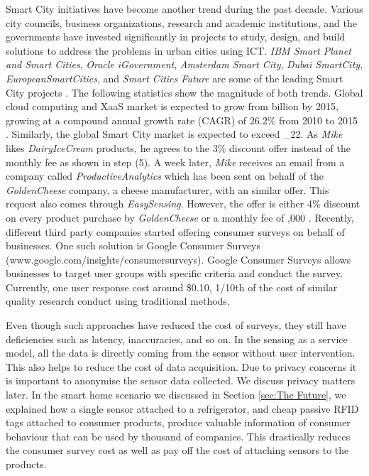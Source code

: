 \documentclass[times]{ettauth}
\begin{document}
Smart City initiatives have become another trend during the past decade. Various city councils, business organizations, research and academic institutions, and the governments have invested significantly in projects to study, design, and build solutions to address the problems in urban cities using ICT. \textit{IBM Smart Planet and Smart Cities}, \textit{Oracle iGovernment},\textit{ Amsterdam Smart City}, \textit{Dubai SmartCity}, \textit{EuropeanSmartCities}, and\textit{ Smart Cities Future} are some of the leading Smart City projects \cite{P537, P536}. The following statistics show the magnitude of both trends. Global cloud computing and XaaS market is expected to grow from  billion by 2015, growing at a compound annual growth rate (CAGR) of 26.2\% from 2010 to 2015 \cite{P539}. Similarly, the global Smart City market is expected to exceed \_{2}2. As \textit{Mike} likes \textit{DairyIceCream} products, he agrees to the 3\% discount offer instead of the monthly fee as shown in  step (5). A week later, \textit{Mike} receives an email from a company called \textit{ProductiveAnalytics} which has been sent on behalf of the \textit{GoldenCheese} company, a cheese manufacturer, with an similar offer. This request  also comes through \textit{EasySensing}. However, the offer is either 4\% discount on every product purchase by \textit{GoldenCheese} or a monthly fee of \8,000 \cite{P632}. Recently, different third party companies started offering consumer surveys on behalf of businesses. One such solution is Google Consumer Surveys (www.google.com/insights/consumersurveys). Google Consumer Surveys allows businesses to target user groups with specific criteria and conduct the survey. Currently, one user response cost around \$0.10, 1/10th of the cost of similar quality research conduct using traditional methods. 

Even though such approaches have reduced the cost of surveys, they still have deficiencies such as latency, inaccuracies, and so on. In the sensing as a service model, all the data is directly coming from the sensor without user intervention. This also helps to reduce the cost of data acquisition. Due to privacy concerns it is important to anonymise the sensor data collected. We discuss privacy matters later. In the smart home scenario we discussed in Section \ref{sec:The Future}, we explained how a  single sensor attached to a refrigerator, and cheap passive RFID tags attached to consumer products, produce valuable information of consumer behaviour that can be used by thousand of companies. This drastically reduces the consumer survey cost as well as pay off the cost of attaching sensors to the products.
\end{document}
